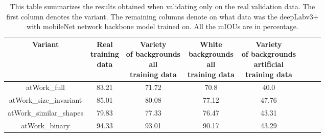 \begin{table}
	\centering
	\begin{tabular}{|c|c|c|c|c|c|c|c|}
	\hline 
    Variant & \makecell{Real \\training \\data} & \makecell{Variety\\ of backgrounds\\ all \\training data} & \makecell{White \\backgrounds\\ all \\training data} & \makecell{Variety\\ of backgrounds\\ artificial \\training data} \\ 
	\hline 
	atWork\_full & 83.21 & 71.72 & 70.8 & 40.0 \\ 
	\hline 
	atWork\_size\_invariant & 85.01 & 80.08 & 77.12 & 47.76 \\ 
	\hline 
	atWork\_similar\_shapes & 79.83 & 77.33 & 76.47 & 43.31 \\ 
	\hline 
	atWork\_binary & 94.33 & 93.01 & 90.17 & 43.29 \\ 
	\hline 
	\end{tabular}
	\caption{This table summarizes the results obtained when validating only on the real validation data. The first column denotes the variant. The remaining columns denote on what data was the deepLabv3+ with mobileNet network backbone model trained on. All the mIOUs are in percentage.} 
	\label{Table:realvalmob}
\end{table}

